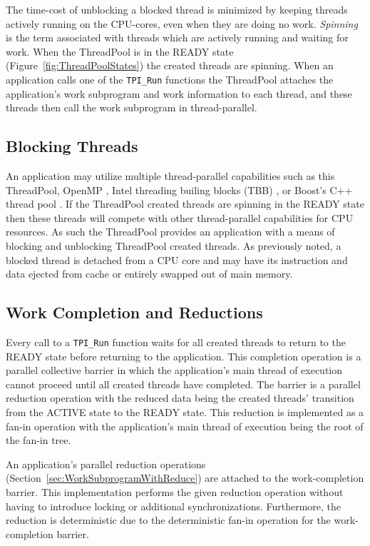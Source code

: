 The time-cost of unblocking a blocked thread is minimized by keeping threads actively running on the CPU-cores, even when they are doing no work.
%
\emph{Spinning} is the term associated with threads which are actively running and waiting for work.
%
When the ThreadPool is in the READY state (Figure~\ref{fig:ThreadPoolStates}) the created threads are spinning.
%
When an application calls one of the \texttt{TPI\_Run} functions the ThreadPool attaches the application's work subprogram and work information to each thread, and these threads then call the work subprogram in thread-parallel.


\subsection{Blocking Threads}

An application may utilize multiple thread-parallel capabilities such as this ThreadPool,
OpenMP \cite{OpenMP:Website}, 
Intel threading builing blocks (TBB) \cite{TBB:Book}, or 
Boost's C++ thread pool \cite{boost:threadpool}.
%
If the ThreadPool created threads are spinning in the READY state then these threads will compete with other thread-parallel capabilities for CPU resources.
%
As such the ThreadPool provides an application with a means of blocking and unblocking ThreadPool created threads.
%
As previously noted, a blocked thread is detached from a CPU core and may have its instruction and data ejected from cache or entirely swapped out of main memory.



\subsection{Work Completion and Reductions}

Every call to a \texttt{TPI\_Run} function waits for all created threads to return to the READY state before returning to the application.
%
This completion operation is a parallel collective barrier in which the application's main thread of execution cannot proceed until all created threads have completed.
%
The barrier is a parallel reduction operation with the reduced data being the created threads' transition from the ACTIVE state to the READY state.
%
This reduction is implemented as a fan-in operation with the application's main thread of execution being the root of the fan-in tree.


An application's parallel reduction operations 
(Section~\ref{sec:WorkSubprogramWithReduce})
are attached to the work-completion barrier.
%
This implementation performs the given reduction operation without having to introduce locking or additional synchronizations.
%
Furthermore, the reduction is deterministic due to the deterministic fan-in operation for the work-completion barrier.





